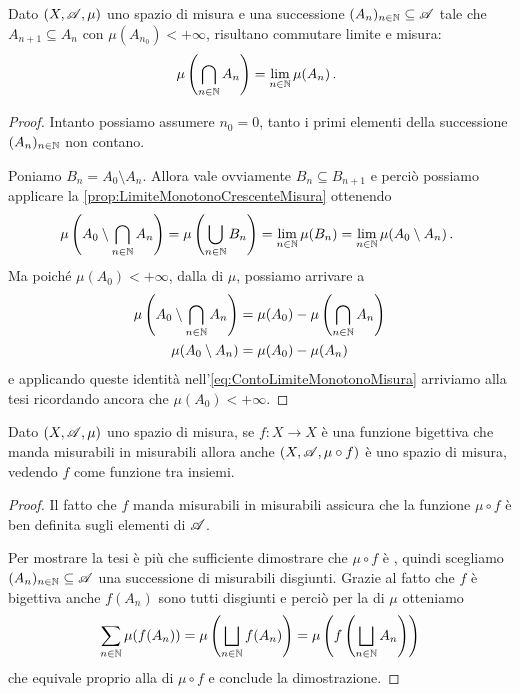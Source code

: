 \begin{corollary}\label{cor:LimiteMonotonoDecrescenteMisura}
	Dato $(X,\mathscr A,\mu)$ uno spazio di misura e una successione $(A_n)_{n\in\mathbb N}\subseteq \mathscr A$ tale che $A_{n+1}\subseteq A_n$ con $\mu(A_{n_0})<+\infty$, risultano commutare limite e misura:
	\begin{equation*}
		\mu\left(\bigcap_{n\in\mathbb N} A_n\right)=\lim_{n\in\mathbb N} \mu(A_n) \, \text{. }
	\end{equation*}
\end{corollary}
\begin{proof}
	Intanto possiamo assumere $n_0=0$, tanto i primi elementi della successione $(A_n)_{n\in\mathbb N}$ non contano.
	
	Poniamo $B_n=A_0\setminus A_n$. 
	Allora vale ovviamente $B_n\subseteq B_{n+1}$ e perciò possiamo applicare la \cref{prop:LimiteMonotonoCrescenteMisura} ottenendo
	\begin{equation}\label{eq:ContoLimiteMonotonoMisura}
		\mu\left(A_0\setminus\bigcap_{n\in\mathbb N}A_n\right)=\mu\left(\bigcup_{n\in\mathbb N}B_n\right)=\lim_{n\in\mathbb N}\mu(B_n)
		=\lim_{n\in\mathbb N}\mu(A_0\setminus A_n) \, \text{. }
	\end{equation}
	Ma poiché $\mu(A_0)<+\infty$, dalla \sigadd[ità] di $\mu$, possiamo arrivare a
	\begin{align*}
		\mu\left(A_0\setminus\bigcap_{n\in\mathbb N}A_n\right)&=\mu(A_0)-\mu\left(\bigcap_{n\in\mathbb N}A_n\right)\\
		\mu(A_0\setminus A_n)&=\mu(A_0)-\mu(A_n)
	\end{align*}
	e applicando queste identità nell'\cref{eq:ContoLimiteMonotonoMisura} arriviamo alla tesi ricordando ancora che $\mu(A_0)<+\infty$.
\end{proof}

\begin{proposition}\label{prop:BigettivaInduceMisura}
	Dato $(X,\mathscr A,\mu)$ uno spazio di misura, se $f:X\to X$ è una funzione bigettiva che manda misurabili in misurabili allora anche $(X,\mathscr A,\mu\circ f)$ è uno spazio di misura, vedendo $f$ come funzione tra insiemi.
\end{proposition}
\begin{proof}
	Il fatto che $f$ manda misurabili in misurabili assicura che la funzione $\mu\circ f$ è ben definita sugli elementi di $\mathscr A$.
	
	Per mostrare la tesi è più che sufficiente dimostrare che $\mu\circ f$ è \sigadd{}, quindi scegliamo $(A_n)_{n\in\mathbb N}\subseteq\mathscr A$ una successione di misurabili disgiunti.
	Grazie al fatto che $f$ è bigettiva anche $f(A_n)$ sono tutti disgiunti e perciò per la \sigadd[ità] di $\mu$ otteniamo
	\begin{equation*}
		\sum_{n\in\mathbb N}\mu(f(A_n))=\mu\left(\bigsqcup_{n\in\mathbb N}f(A_n)\right)=\mu\left(f\left(\bigsqcup_{n\in\mathbb N}A_n\right)\right)
	\end{equation*}
	che equivale proprio alla \sigadd[ità] di $\mu\circ f$ e conclude la dimostrazione.
\end{proof}



